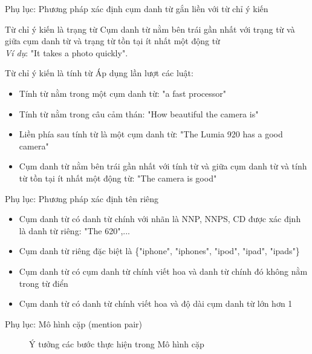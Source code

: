 \documentclass[9pt,xcolor=table,hyperref=unicode]{beamer}
\begin{document}
		\begin{frame}{Phụ lục: Phương pháp xác định cụm danh từ gắn liền với từ chỉ ý kiến}
			\begin{block}{Từ chỉ ý kiến là trạng từ}
				Cụm danh từ nằm bên trái gần nhất với trạng từ và giữa cụm danh từ và trạng từ tồn tại ít nhất một động từ \\
				\textit{Ví dụ}: "It takes a photo quickly".
			\end{block}
			\begin{block}{Từ chỉ ý kiến là tính từ}
				Áp dụng lần lượt các luật:
				\begin{itemize}
					\item{Tính từ nằm trong một cụm danh từ: "a fast processor"}
					\item{Tính từ nằm trong câu cảm thán: "How beautiful the camera is"}
					\item{Liền phía sau tính từ là một cụm danh từ: "The Lumia 920 has a good camera"}
					\item{Cụm danh từ nằm bên trái gần nhất với tính từ và giữa cụm danh từ và tính từ tồn tại ít nhất một động từ: "The camera is good"}
				\end{itemize}
			\end{block}
		\end{frame}	

		\begin{frame}{Phụ lục: Phương pháp xác định tên riêng}
			\begin{itemize}
				\item{Cụm danh từ có danh từ chính với nhãn là NNP, NNPS, CD được xác định là danh từ riêng: "The 620",...}
				\item{Cụm danh từ riêng đặc biệt là \{"iphone", "iphones", "ipod", "ipad", "ipads"\}}
				\item{Cụm danh từ có cụm danh từ chính viết hoa và danh từ chính đó không nằm trong từ điển}
				\item{Cụm danh từ có danh từ chính viết hoa và độ dài cụm danh từ lớn hơn 1}
			\end{itemize}
		\end{frame}		

		\begin{frame}{Phụ lục: Mô hình cặp (mention pair)}
			\begin{figure}[H]
				\centering
				\scalebox{.8}{}
				\caption{Ý tưởng các bước thực hiện trong Mô hình cặp}
				\label{fig:mentionpair}
			\end{figure}
		\end{frame}
\end{document}
